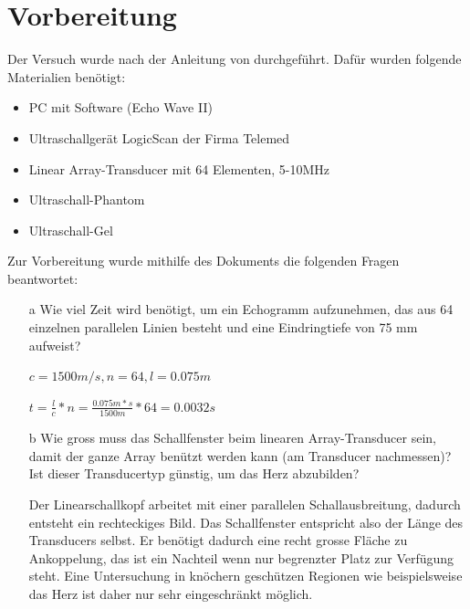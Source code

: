 \documentclass[11pt]{scrartcl}
\begin{document}

    \section{Vorbereitung}
   
    Der Versuch wurde nach der Anleitung von \cite{Echographie} durchgeführt.
    Dafür wurden folgende Materialien benötigt:

    \begin{itemize}
        \item PC mit Software (Echo Wave II)
        \item Ultraschallgerät LogicScan der Firma Telemed
        \item Linear Array-Transducer mit 64 Elementen, 5-10MHz
        \item Ultraschall-Phantom
        \item Ultraschall-Gel
        
    \end{itemize}

    Zur Vorbereitung wurde mithilfe des Dokuments \cite{medUS} die folgenden Fragen beantwortet: %

    \begin{itemize}
        \item[a] Wie viel Zeit wird benötigt, um ein Echogramm aufzunehmen, das aus 64 einzelnen parallelen Linien besteht und eine Eindringtiefe von 75 mm aufweist?
        \item[] $c=1500m/s, n=64, l=0.075m$
        \item[] $t=\frac{l}{c}*n=\frac{0.075m*s}{1500m}*64=0.0032s$
        \item[b] Wie gross muss das Schallfenster beim linearen Array-Transducer sein, damit der ganze Array benützt werden kann (am Transducer nachmessen)?
                 Ist dieser Transducertyp günstig, um das Herz abzubilden?
        \item[]  Der Linearschallkopf arbeitet mit einer parallelen Schallausbreitung, dadurch entsteht ein rechteckiges Bild.
        Das Schallfenster entspricht also der Länge des Transducers selbst.
        Er benötigt dadurch eine recht grosse Fläche zu Ankoppelung, das ist ein Nachteil wenn nur begrenzter Platz zur Verfügung steht.
        Eine Untersuchung in knöchern geschützen Regionen wie
        beispielsweise das Herz ist daher nur sehr eingeschränkt möglich.
    \end{itemize}
\end{document}
